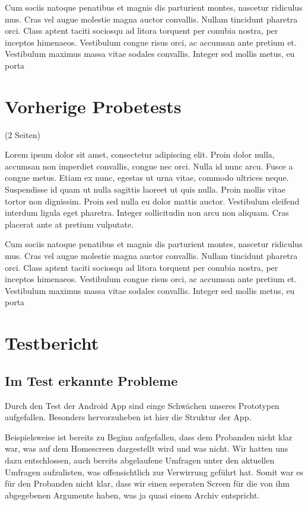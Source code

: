 Cum sociis natoque penatibus et magnis dis parturient montes, nascetur ridiculus mus. Cras vel augue molestie magna auctor convallis. Nullam tincidunt pharetra orci. Class aptent taciti sociosqu ad litora torquent per conubia nostra, per inceptos himenaeos. Vestibulum congue risus orci, ac accumsan ante pretium et. Vestibulum maximus massa vitae sodales convallis. Integer sed mollis metus, eu porta

\clearpage
\section{Vorherige Probetests}
\label{sec:probetests}

(2 Seiten)

Lorem ipsum dolor sit amet, consectetur adipiscing elit. Proin dolor nulla, accumsan non imperdiet convallis, congue nec orci. Nulla id nunc arcu. Fusce a congue metus. Etiam ex nunc, egestas ut urna vitae, commodo ultrices neque. Suspendisse id quam ut nulla sagittis laoreet ut quis nulla. Proin mollis vitae tortor non dignissim. Proin sed nulla eu dolor mattis auctor. Vestibulum eleifend interdum ligula eget pharetra. Integer sollicitudin non arcu non aliquam. Cras placerat ante at pretium vulputate.

Cum sociis natoque penatibus et magnis dis parturient montes, nascetur ridiculus mus. Cras vel augue molestie magna auctor convallis. Nullam tincidunt pharetra orci. Class aptent taciti sociosqu ad litora torquent per conubia nostra, per inceptos himenaeos. Vestibulum congue risus orci, ac accumsan ante pretium et. Vestibulum maximus massa vitae sodales convallis. Integer sed mollis metus, eu porta

\clearpage
\section{Testbericht}
\label{sec:testbericht}

\subsection{Im Test erkannte Probleme}
\label{sec:foundproblemes}

Durch den Test der Android App sind einge Schwächen unseres Prototypen aufgefallen. Besonders hervorzuheben ist hier die Struktur der App.

Beispielsweise ist bereits zu Beginn aufgefallen, dass dem Probanden nicht klar war, was auf dem Homescreen dargestellt wird und was nicht. Wir hatten uns dazu entschlossen, auch bereits abgelaufene Umfragen unter den aktuellen Umfragen aufzulisten, was offensichtlich zur Verwirrung geführt hat. Somit war es für den Probanden nicht klar, dass wir einen seperaten Screen für die von ihm abgegebenen Argumente haben, was ja quasi einem Archiv entspricht.

